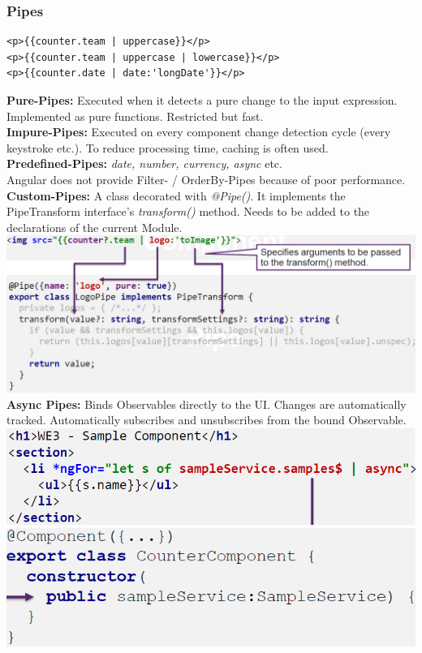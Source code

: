 \subsubsection{Pipes}
\begin{lstlisting}
<p>{{counter.team | uppercase}}</p>
<p>{{counter.team | uppercase | lowercase}}</p>
<p>{{counter.date | date:'longDate'}}</p>
\end{lstlisting}
\textbf{Pure-Pipes:} Executed when it detects a pure change to the input expression.
Implemented as pure functions. Restricted but fast.\\
\textbf{Impure-Pipes:} Executed on every component change detection cycle (every keystroke etc.).
To reduce processing time, caching is often used.\\
\textbf{Predefined-Pipes:} \textit{date, number, currency, async} etc.\\
Angular does not provide Filter- / OrderBy-Pipes because of poor performance.\\
\textbf{Custom-Pipes:} A class decorated with \textit{@Pipe()}.
It implements the PipeTransform interface's \textit{transform()} method.
Needs to be added to the declarations of the current Module.
\includegraphics[width=\linewidth]{img/angular_pipes.png}
\textbf{Async Pipes:} Binds Observables directly to the UI.
Changes are automatically tracked.
Automatically subscribes and unsubscribes from the bound Observable.\\
\includegraphics[width=0.6\linewidth]{img/angular_async_pipes.png}
\includegraphics[width=0.4\linewidth]{img/angular_async_pipes2.png}

